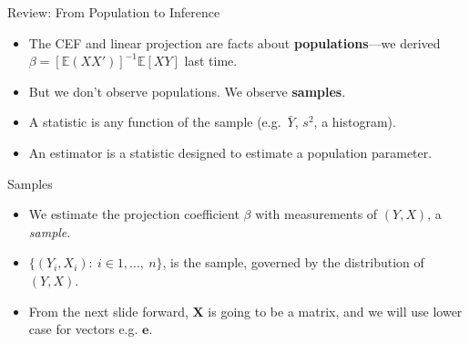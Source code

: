 \documentclass[aspectratio=169, handout]{beamer}
\numberwithin{equation}{section}
\begin{document}
\begin{frame}{Review: From Population to Inference}
\begin{itemize}
\item The CEF and linear projection are facts about \textbf{populations}---we derived $\beta=[\mathbb{E}(XX')]^{-1}\mathbb{E}[XY]$ last time.\pause
\item But we don't observe populations. We observe \textbf{samples}.\pause
\end{itemize}
\vspace{0.5em}
\begin{center}
\end{center}
\vspace{0.3em}
\begin{itemize}
\item A \alert{statistic} is any function of the sample (e.g.\ $\bar{Y}$, $s^2$, a histogram).
\item An \alert{estimator} is a statistic designed to estimate a population parameter.
\end{itemize}
\end{frame}

\begin{frame}{Samples}
\begin{itemize}
\item We estimate the projection coefficient $\beta$ with measurements of $(Y,X)$, a \emph{sample}.\pause
\item $\{(Y_i, X_i):\ i\in1,\ldots,\ n\}$, is the sample, governed by the distribution of $(Y,X)$.\pause
\item From the next slide forward, $\bm{X}$ is going to be a matrix, and we will use lower case for vectors e.g. $\bm{e}$.
\end{itemize}
\end{frame}
\end{document}
